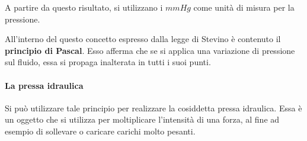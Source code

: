 A partire da questo risultato, si utilizzano i $mmHg$ come unità di misura per la pressione.

All'interno del questo concetto espresso dalla legge di Stevino è contenuto il \textbf{principio di Pascal}. Esso afferma che se si applica una variazione di pressione sul fluido, essa si propaga inalterata in tutti i suoi punti.

\paragraph{La pressa idraulica} Si può utilizzare tale principio per realizzare la cosiddetta pressa idraulica. Essa è un oggetto che si utilizza per moltiplicare l'intensità di una forza, al fine ad esempio di sollevare o caricare carichi molto pesanti.

\begin{figure}[htpb]
	\centering


	\begin{tikzpicture}[x=0.75pt,y=0.75pt,yscale=-1,xscale=1]


\end{tikzpicture}
\end{figure}
